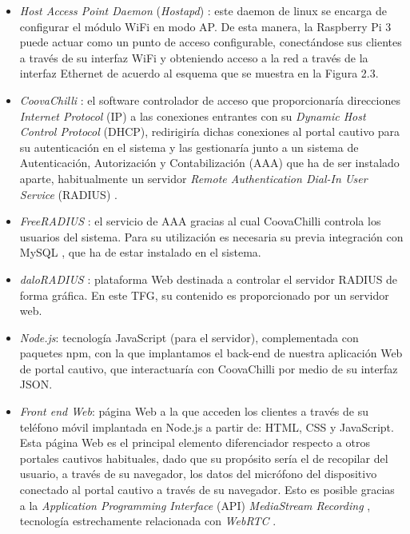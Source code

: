 \begin{itemize}
\item \emph{Host Access Point Daemon} (\emph{\acrshort{Hostapd}}) \cite{hostapdDoc}: este daemon de linux se encarga de configurar el módulo WiFi en modo \acrshort{AP}. De esta manera, la Raspberry Pi 3 puede actuar como un punto de acceso configurable, conectándose sus clientes a través de su interfaz \acrshort{WiFi} y obteniendo acceso a la red a través de la interfaz Ethernet de acuerdo al esquema que se muestra en la Figura 2.3.
\item \emph{CoovaChilli} \cite{ChilliGitHub}: el software controlador de acceso que proporcionaría direcciones \emph{Internet Protocol} (\acrshort{IP}) a las conexiones entrantes con su \emph{Dynamic Host Control Protocol} (\acrshort{DHCP}), redirigiría dichas conexiones al portal cautivo para su autenticación en el sistema y las gestionaría junto a un sistema de Autenticación, Autorización y Contabilización (\acrshort{AAA}) que ha de ser instalado aparte, habitualmente un servidor \emph{Remote Authentication Dial-In User Service} (\acrshort{RADIUS}) \cite{RADIUS}.
\item \emph{FreeRADIUS} \cite{FreeRADIUSDoc}: el servicio de \acrshort{AAA} gracias al cual CoovaChilli controla los usuarios del sistema. Para su utilización es necesaria su previa integración con My\acrshort{SQL} \cite{PHPMySQLJavaScript}, que ha de estar instalado en el sistema.
\item \emph{daloRADIUS} \cite{daloRADIUS1}: plataforma Web destinada a controlar el servidor RADIUS de forma gráfica. En este TFG, su contenido es proporcionado por un servidor web.
\item \emph{Node.js}: tecnología JavaScript (para el servidor), complementada con paquetes \acrshort{npm}, con la que implantamos el back-end de nuestra aplicación Web de portal cautivo, que interactuaría con CoovaChilli por medio de su interfaz \acrshort{JSON}.
\item \emph{Front end Web}: página Web a la que acceden los clientes a través de su teléfono móvil implantada en Node.js a partir de: \acrshort{HTML}, \acrshort{CSS} y JavaScript. Esta página Web es el principal elemento diferenciador respecto a otros portales cautivos habituales, dado que su propósito sería el de recopilar del usuario, a través de su navegador, los datos del micrófono del dispositivo conectado al portal cautivo a través de su navegador. Esto es posible gracias a la \emph{Application Programming Interface} (\acrshort{API}) \emph{MediaStream Recording} \cite{MediaStreamRecordingAPI}, tecnología estrechamente relacionada con \emph{\acrshort{WebRTC}} \cite{LibroWebRTC1}.
\end{itemize}

